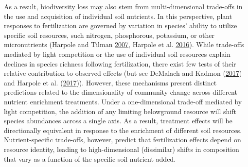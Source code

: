\documentclass[twoside,12pt,final]{ucthesis-CA2012}
\begin{document}
\begin{ucmainmatter}
As a result, biodiversity loss may also stem from multi-dimensional trade-offs in the use and acquisition of individual soil nutrients. In this perspective, plant responses to fertilization are governed by variation in species' ability to utilize specific soil resources, such nitrogen, phosphorous, potassium, or other micronutrients (Harpole and Tilman \protect\hyperlink{ref-Harpole2007}{2007}, Harpole et al. \protect\hyperlink{ref-Harpole2016}{2016}).
While trade-offs mediated by light competition or the use of individual soil resources explain declines in species richness following fertilization, there exist few tests of their relative contribution to observed effects (but see DeMalach and Kadmon (\protect\hyperlink{ref-DeMalach2017b}{2017}) and Harpole et al. (\protect\hyperlink{ref-Harpole2017}{2017})).
However, these mechanisms present distinct predictions related to the dimensionality of community change across different nutrient enrichment treatments. Under a one-dimensional trade-off mediated by light competition, the addition of any limiting belowground resource will shift species abundances across a single axis.
As a result, treatment effects will be directionally equivalent in response to the enrichment of different soil resources. Nutrient-specific trade-offs, however, predict that fertilization effects depend on resource identity, leading to high-dimensional (dissimilar) shifts in composition that vary as a function of the specific soil nutrient added.


\end{ucmainmatter}
\end{document}
